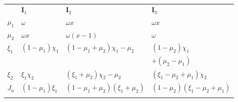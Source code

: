 \documentclass[oneside,onecolumn,10pt,final]{asme2ej}
\begin{document}
\appendix       %

\begin{table}[tb]
  \centering
  \caption{  
    \cite{rf:taylordj1,rf:jdelia-gbem1}}
  \smallskip
  \label{ta:duffy_panel_comun2}
  \begin{tabular}{llll}
    \hline\noalign{\smallskip}
                 &
   $ \bm {I}_1 $ &
   $ \bm {I}_2 $ &
   $ \bm {I}_3 $ \\
    \noalign{\smallskip}\hline\noalign{\smallskip}
 $ \mu_1    $  &
 $ \omega   $  &
 $ \omega x $  &
 $ \omega x $  \\
 $ \mu_2    $      &
 $ \omega x $      &
 $ \omega (x - 1)$ &
 $ \omega        $ \\
 $ \xi_{1}                                     $ &
 $ (1 - \mu_1)         \chi_1                  $ &
 $ (1 - \mu_1 + \mu_2) \chi_1 - \mu_2          $ &
 $ (1 - \mu_2) \chi_1  $ \\ %
 $                                             $ &
 $                                             $ &
 $                                             $ &
 $ + (\mu_2 - \mu_1)                            $ \\
 $ \xi_{2}                                     $ &
 $ \xi_1 \chi_2                                $ &
 $ (\xi_1 + \mu_2) \chi_2 - \mu_2              $ &
 $ (\xi_1 - \mu_2 + \mu_1) \chi_2              $ \\
 $ J_n                                         $ &
 $ (1 - \mu_1)          \xi_1                  $ &
 $ (1 - \mu_1 + \mu_2) (\xi_1 + \mu_2)          $ &
 $ (1 - \mu_2) (\xi_1 - \mu_2 + \mu_1) $ \\
\noalign{\smallskip}\hline
\end{tabular}
\end{table}
\end{document}
